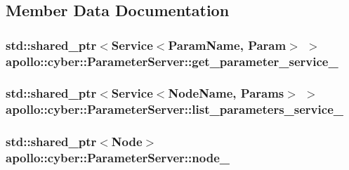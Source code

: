 \subsection{Member Data Documentation}
\hypertarget{classapollo_1_1cyber_1_1ParameterServer_adf90630f82004589b443f9c24b66f230}{
\subsubsection[{get\-\_\-parameter\-\_\-service\-\_\-}]{\setlength{\rightskip}{0pt plus 5cm}std\-::shared\-\_\-ptr$<${\bf Service}$<${\bf Param\-Name}, {\bf Param}$>$ $>$ apollo\-::cyber\-::\-Parameter\-Server\-::get\-\_\-parameter\-\_\-service\-\_\-\hspace{0.3cm}{\ttfamily [private]}}}\label{classapollo_1_1cyber_1_1ParameterServer_adf90630f82004589b443f9c24b66f230}
\hypertarget{classapollo_1_1cyber_1_1ParameterServer_a64f0850ba2189ecf105e0e9cf14bde94}{
\subsubsection[{list\-\_\-parameters\-\_\-service\-\_\-}]{\setlength{\rightskip}{0pt plus 5cm}std\-::shared\-\_\-ptr$<${\bf Service}$<${\bf Node\-Name}, {\bf Params}$>$ $>$ apollo\-::cyber\-::\-Parameter\-Server\-::list\-\_\-parameters\-\_\-service\-\_\-\hspace{0.3cm}{\ttfamily [private]}}}\label{classapollo_1_1cyber_1_1ParameterServer_a64f0850ba2189ecf105e0e9cf14bde94}
\hypertarget{classapollo_1_1cyber_1_1ParameterServer_aff97f5c8d606d874176a4a547be55a8b}{
\subsubsection[{node\-\_\-}]{\setlength{\rightskip}{0pt plus 5cm}std\-::shared\-\_\-ptr$<${\bf Node}$>$ apollo\-::cyber\-::\-Parameter\-Server\-::node\-\_\-\hspace{0.3cm}{\ttfamily [private]}}}\label{classapollo_1_1cyber_1_1ParameterServer_aff97f5c8d606d874176a4a547be55a8b}
